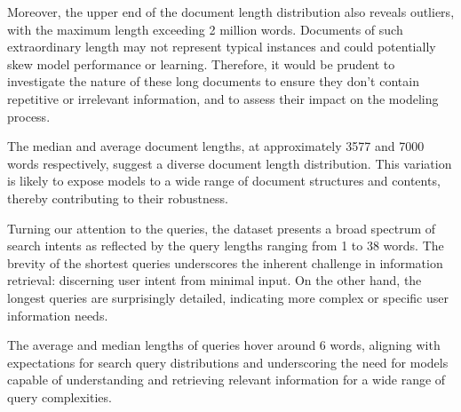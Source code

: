 \documentclass[11pt,a4paper]{article}
\begin{document}
Moreover, the upper end of the document length distribution also
reveals outliers, with the maximum length exceeding 2 million words.
Documents of such extraordinary length may not represent typical
instances and could potentially skew model performance or learning.
Therefore, it would be prudent to investigate the nature of these
long documents to ensure they don't contain repetitive or irrelevant
information, and to assess their impact on the modeling process.

The median and average document lengths, at approximately 3577 and
7000 words respectively, suggest a diverse document length
distribution. This variation is likely to expose models to a wide
range of document structures and contents, thereby contributing to
their robustness.

Turning our attention to the queries, the dataset presents a broad
spectrum of search intents as reflected by the query lengths ranging
from 1 to 38 words. The brevity of the shortest queries underscores
the inherent challenge in information retrieval: discerning user
intent from minimal input. On the other hand, the longest queries are
surprisingly detailed, indicating more complex or specific user
information needs.

The average and median lengths of queries hover around 6 words,
aligning with expectations for search query distributions and
underscoring the need for models capable of understanding and
retrieving relevant information for a wide range of query
complexities.
\end{document}
